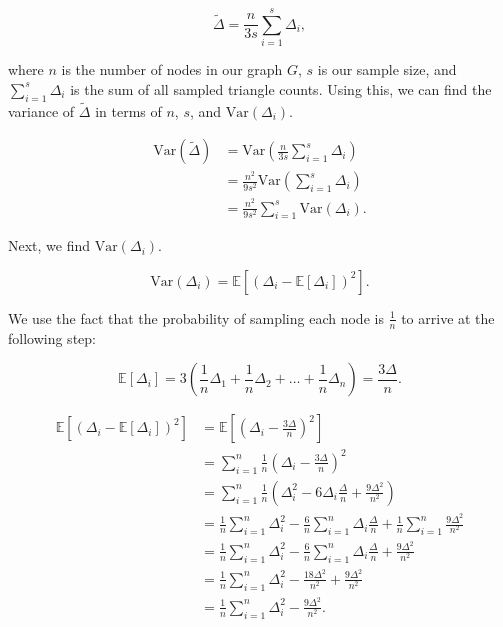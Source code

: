 \documentclass[11pt, margin=1in]{article}
\begin{document}
\[
\tilde{\Delta} = \frac{n}{3s} \sum_{i = 1}^{s} \Delta_i,
\]

where $n$ is the number of nodes in our graph $G$, $s$ is our sample size, and $\sum_{i = 1}^{s} \Delta_i$ is the sum of all sampled triangle counts. 
Using this, we can find the variance of $\tilde{\Delta}$ in terms of $n$, $s$, and $\mathrm{Var}\left(\Delta_i\right)$.

\[
\begin{aligned}
\mathrm{Var}\left(\tilde{\Delta}\right) &= \mathrm{Var} \left( \frac{n}{3s} \sum_{i=1}^{s} \Delta_i \right) \\
&= \frac{n^2}{9s^2} \mathrm{Var} \left( \sum_{i=1}^{s} \Delta_i \right) \\
&= \frac{n^2}{9s^2} \sum_{i=1}^{s} \mathrm{Var}\left(\Delta_i\right).
\end{aligned}
\]

Next, we find $\mathrm{Var}\left(\Delta_i\right)$.

\[
\mathrm{Var}\left(\Delta_i\right) = \mathbb{E}\left[\left(\Delta_i - \mathbb{E}[\Delta_i]\right)^2\right].
\]

We use the fact that the probability of sampling each node is $\frac{1}{n}$ to arrive at the following step:

\[
\mathbb{E}\left[\Delta_i\right] = 3\left(\frac{1}{n} \Delta_1 + \frac{1}{n} \Delta_2 + \ldots + \frac{1}{n} \Delta_n\right) = \frac{3\Delta}{n}.
\]

\[
\begin{aligned}
\mathbb{E}\left[\left(\Delta_i - \mathbb{E}\left[\Delta_i\right]\right)^2\right] &= \mathbb{E}\left[\left(\Delta_i - \frac{3\Delta}{n}\right)^2\right] \\
&= \sum_{i = 1}^{n} \frac{1}{n} \left(\Delta_i - \frac{3\Delta}{n}\right)^2 \\
&= \sum_{i = 1}^{n} \frac{1}{n} \left(\Delta_i^2 - 6 \Delta_i \frac{\Delta}{n} + \frac{9\Delta^2}{n^2}\right) \\
&= \frac{1}{n} \sum_{i = 1}^{n} \Delta_i^2 - \frac{6}{n} \sum_{i = 1}^{n} \Delta_i \frac{\Delta}{n} + \frac{1}{n} \sum_{i = 1}^{n} \frac{9\Delta^2}{n^2} \\
&= \frac{1}{n} \sum_{i = 1}^{n} \Delta_i^2 - \frac{6}{n} \sum_{i = 1}^{n} \Delta_i \frac{\Delta}{n} + \frac{9\Delta^2}{n^2} \\
&= \frac{1}{n} \sum_{i = 1}^{n} \Delta_i^2 - \frac{18\Delta^2}{n^2} + \frac{9\Delta^2}{n^2} \\
&= \frac{1}{n} \sum_{i = 1}^{n} \Delta_i^2 - \frac{9\Delta^2}{n^2}.
\end{aligned}
\]
\end{document}

